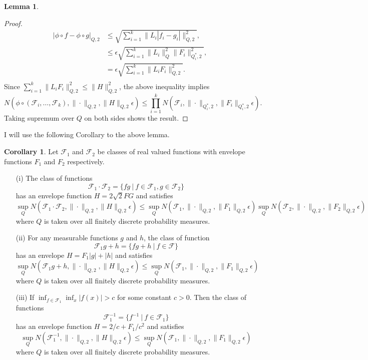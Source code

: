 \documentclass[12pt,oneside,reqno,english]{amsart}
\theoremstyle{definition}
\newtheorem{corollary}{Corollary}
\newtheorem{lemma}{Lemma}
\begin{document}
\begin{lemma}
\begin{proof}
\begin{align*}
|\phi\circ f-\phi\circ g |_{Q,2}&\leq \sqrt{\sum_{i=1}^{k}\|L_{i}|f_{i}-g_{i}|\|_{Q,2}^{2}},\\
&\leq  \epsilon\sqrt{\sum_{i=1}^{k}\|L_{i}\|_{Q}^{2}\|F_{i}\|_{Q^{*}_{i},2}^{2}},\\
&=  \epsilon \sqrt{\sum_{i=1}^{k} \|L_{i}F_{i}\|_{Q,2}^{2}}.\\
\end{align*}
Since $\sum_{i=1}^{k} \|L_{i}F_{i}\|_{Q,2}^{2}\leq \|H\|_{Q,2}^{2}$, the above inequality implies 
\[N(\phi\circ (\mathcal{F}_{i},\ldots,\mathcal{F}_{k}),\|\cdot\|_{Q,2},\|H\|_{Q,2}\epsilon)\leq \prod_{i=1}^{k}N(\mathcal{F}_{i},\| \cdot \|_{Q^{*}_{i},2},\|F_{i}\|_{Q^{*}_{i},2}\epsilon).\]
Taking supremum over $Q$ on both sides shows the result. 
\end{proof}
\end{lemma}
I will use the following Corollary to the above lemma.  
\begin{corollary}\label{c:entropy}
Let $\mathcal{F}_{1}$ and $\mathcal{F}_{2}$ be classes of real valued functions with envelope functions $F_{1}$ and $F_{2}$ respectively.
\begin{itemize}
\item[{(i)}]  The class of functions 
\[\mathcal{F}_{1}\cdot\mathcal{F}_{2}=\{fg\ | \ f\in \mathcal{F}_{1}, g\in \mathcal{F}_{2}\} \]
has an envelope function $H=2\sqrt{2}FG$ and satisfies
\[\sup_{Q}N(\mathcal{F}_{1}\cdot\mathcal{F}_{2},\|\cdot\|_{Q,2},\|H\|_{Q,2}\epsilon)\leq 
\sup_{Q}N(\mathcal{F}_{1},\|\cdot\|_{Q,2},\|F_{1}\|_{Q,2}\epsilon)\sup_{Q}N(\mathcal{F}_{2},\|\cdot\|_{Q,2},\|F_{2}\|_{Q,2}\epsilon)\]
where $Q$ is taken over all finitely discrete probability measures.
\item[{(ii)}] For any measurable functions $g$ and $h$,
 the class of function 
 \[\mathcal{F}_{1}g+h=\{fg+h\ | \ f\in \mathcal{F}\} \]
has an envelope $H=F_{1}|g|+|h|$ and satisfies
\[\sup_{Q}N(\mathcal{F}_{1}g+h,\|\cdot\|_{Q,2},\|H\|_{Q,2}\epsilon)\leq 
\sup_{Q}N(\mathcal{F}_{1},\|\cdot\|_{Q,2},\|F_{1}\|_{Q,2}\epsilon)\]
where $Q$ is taken over all finitely discrete probability measures.
\item[{(iii)}] If $\inf_{f\in \mathcal{F}_{1}}\inf_{x}|f(x)|>c$ for some constant $c>0$.
 Then the class of functions  
\[\mathcal{F}_{1}^{-1}=\{f^{-1}\ | \ f\in \mathcal{F}_{1}\}\]
has an envelope function $H=2/c+F_{1}/c^{2}$ and satisfies 
\[\sup_{Q}N(\mathcal{F}_{1}^{-1},\|\cdot\|_{Q,2},\|H\|_{Q,2}\epsilon)\leq 
\sup_{Q}N(\mathcal{F}_{1},\|\cdot\|_{Q,2},\|F_{1}\|_{Q,2}\epsilon)\]
where $Q$  is taken over all finitely discrete probability measures.
\end{itemize}
\end{corollary}
\end{document}
